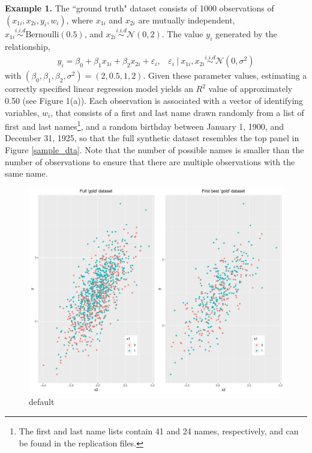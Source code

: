 \documentclass[12pt]{article}
\begin{document}
\textbf{Example 1.}   The ``ground truth" dataset consists of 1000 observations of $(x_{1i}, x_{2i}, y_i, w_i)$, where $x_{1i}$ and $x_{2i}$ are mutually independent, $x_{1i} \overset{i.i.d}{\sim} \text{Bernoulli}(0.5)$, and $x_{2i} \overset{i.i.d}{\sim} \mathcal{N}(0, 2)$.  The value $y_i$ generated by the relationship,
\begin{gather}
y_i = \beta_0 + \beta_1 x_{1i} + \beta_2 x_{2i} + \varepsilon_i, \hspace{10pt} 
\varepsilon_i\  |\  x_{1i}, x_{2i} \overset{i.i.d}{\sim} \mathcal{N}(0, \sigma^2) 
\end{gather}
with $(\beta_0, \beta_1, \beta_2, \sigma^2) = (2, 0.5, 1, 2)$.  Given these parameter values, estimating a correctly specified linear regression model yields an $R^2$ value of approximately 0.50 (see Figure 1(a)).  Each observation is associated with a vector of identifying variables, $w_i$, that consists of a first and last name drawn randomly from a list of first and last names\footnote{The first and last name lists contain 41 and 24 names, respectively, and can be found in the replication files.}, and a random birthday between January 1, 1900, and December 31, 1925, so that the full synthetic dataset resembles the top panel in Figure \ref{sample_dta}.  Note that the number of possible names is smaller than the number of observations to ensure that there are multiple observations with the same name. 
 
 
 
\begin{figure}[htbp]
\begin{center}
\includegraphics[width=\textwidth]{./Figures/gold_data_compare.pdf}
\caption{default}
\label{default}
\end{center}
\end{figure}
\end{document}
